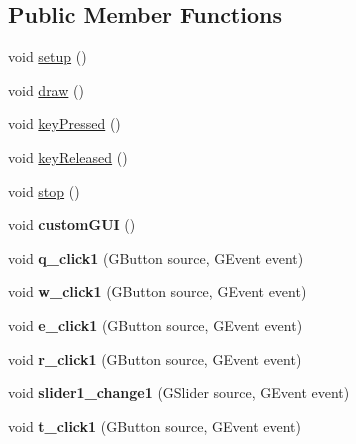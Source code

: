 \subsection*{Public Member Functions}
\begin{DoxyCompactItemize}
\item 
void \hyperlink{classkeyplayer__gui_a4f51c3d761204be4bc5ba4f48e806e41}{setup} ()
\item 
void \hyperlink{classkeyplayer__gui_ae66ace1d0588e8896343b325869eb470}{draw} ()
\item 
void \hyperlink{classkeyplayer__gui_a11a22f0316258cecae2fd0cca0ffb066}{key\+Pressed} ()
\item 
void \hyperlink{classkeyplayer__gui_a4c150bd38043603ea0fb728e613f280d}{key\+Released} ()
\item 
void \hyperlink{classkeyplayer__gui_a70e441c8e0a91ac353fc89ef9b3b98bf}{stop} ()
\item 
\hypertarget{classkeyplayer__gui_a2aa16036156f3c1162cbb5ed914b6d0e}{void {\bfseries custom\+G\+U\+I} ()}\label{classkeyplayer__gui_a2aa16036156f3c1162cbb5ed914b6d0e}

\item 
\hypertarget{classkeyplayer__gui_af27ee7b976b3ca3c7904eeaf8997398c}{void {\bfseries q\+\_\+click1} (G\+Button source, G\+Event event)}\label{classkeyplayer__gui_af27ee7b976b3ca3c7904eeaf8997398c}

\item 
\hypertarget{classkeyplayer__gui_a9bd46c0099801f8bf028098851413689}{void {\bfseries w\+\_\+click1} (G\+Button source, G\+Event event)}\label{classkeyplayer__gui_a9bd46c0099801f8bf028098851413689}

\item 
\hypertarget{classkeyplayer__gui_a7841852b38e4abd997b8d3ded6ac20ba}{void {\bfseries e\+\_\+click1} (G\+Button source, G\+Event event)}\label{classkeyplayer__gui_a7841852b38e4abd997b8d3ded6ac20ba}

\item 
\hypertarget{classkeyplayer__gui_af61b8f4a996c76e6cfe90d8a988c0be6}{void {\bfseries r\+\_\+click1} (G\+Button source, G\+Event event)}\label{classkeyplayer__gui_af61b8f4a996c76e6cfe90d8a988c0be6}

\item 
\hypertarget{classkeyplayer__gui_a3455aeebb5d53bcfd236be172961244b}{void {\bfseries slider1\+\_\+change1} (G\+Slider source, G\+Event event)}\label{classkeyplayer__gui_a3455aeebb5d53bcfd236be172961244b}

\item 
\hypertarget{classkeyplayer__gui_aaec3693f64267b2053912dcf4fd32660}{void {\bfseries t\+\_\+click1} (G\+Button source, G\+Event event)}\label{classkeyplayer__gui_aaec3693f64267b2053912dcf4fd32660}


\end{DoxyCompactItemize}
